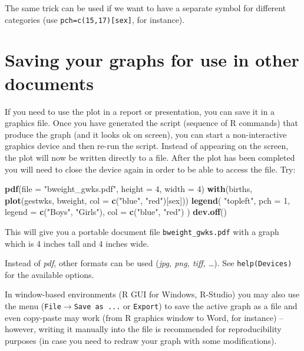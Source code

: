 \documentclass[
]{book}
\newenvironment{Shaded}{\begin{snugshade}}{\end{snugshade}}
\newcommand{\AttributeTok}[1]{\textcolor[rgb]{0.13,0.29,0.53}{#1}}
\newcommand{\DecValTok}[1]{\textcolor[rgb]{0.00,0.00,0.81}{#1}}
\newcommand{\FunctionTok}[1]{\textcolor[rgb]{0.13,0.29,0.53}{\textbf{#1}}}
\newcommand{\NormalTok}[1]{#1}
\newcommand{\StringTok}[1]{\textcolor[rgb]{0.31,0.60,0.02}{#1}}
\begin{document}
The same trick can be used if we want to have a separate symbol for
different categories (use \texttt{pch=c(15,17){[}sex{]}}, for instance).

\section{Saving your graphs for use in other documents}\label{saving-your-graphs-for-use-in-other-documents}

If you need to use the plot in a report or presentation, you can save it in a graphics file.
Once you have generated the script (sequence of R commands) that produce the graph (and it looks ok on screen),
you can start a non-interactive graphics device and then re-run the script.
Instead of appearing on the screen, the plot will now be written
directly to a file. After the plot has been completed you will need
to close the device again in order to be able to access the file. Try:

\begin{Shaded}
\begin{Highlighting}[]
\FunctionTok{pdf}\NormalTok{(}\AttributeTok{file =} \StringTok{"bweight\_gwks.pdf"}\NormalTok{, }\AttributeTok{height =} \DecValTok{4}\NormalTok{, }\AttributeTok{width =} \DecValTok{4}\NormalTok{)}
\FunctionTok{with}\NormalTok{(births, }\FunctionTok{plot}\NormalTok{(gestwks, bweight, }\AttributeTok{col =} \FunctionTok{c}\NormalTok{(}\StringTok{"blue"}\NormalTok{, }\StringTok{"red"}\NormalTok{)[sex]))}
\FunctionTok{legend}\NormalTok{(}
  \StringTok{"topleft"}\NormalTok{, }
  \AttributeTok{pch =} \DecValTok{1}\NormalTok{, }
  \AttributeTok{legend =} \FunctionTok{c}\NormalTok{(}\StringTok{"Boys"}\NormalTok{, }\StringTok{"Girls"}\NormalTok{), }
  \AttributeTok{col =} \FunctionTok{c}\NormalTok{(}\StringTok{"blue"}\NormalTok{, }\StringTok{"red"}\NormalTok{)}
\NormalTok{)}
\FunctionTok{dev.off}\NormalTok{()}
\end{Highlighting}
\end{Shaded}

This will give you a portable document file \texttt{bweight\_gwks.pdf} with a graph
which is 4 inches tall and 4 inches wide.

Instead of \emph{pdf}, other formats can be used (\emph{jpg, png, tiff, \ldots{}}). See \texttt{help(Devices)} for the available options.

In window-based environments (R GUI for Windows, R-Studio) you may also use the menu
(\texttt{File}\(\rightarrow\)\texttt{Save\ as\ ...} or \texttt{Export}) to save the active graph as a file and even copy-paste may work (from R graphics window to Word, for instance) -- however, writing it manually into the file is recommended for reproducibility purposes (in case you need to redraw your graph with some modifications).
\end{document}

